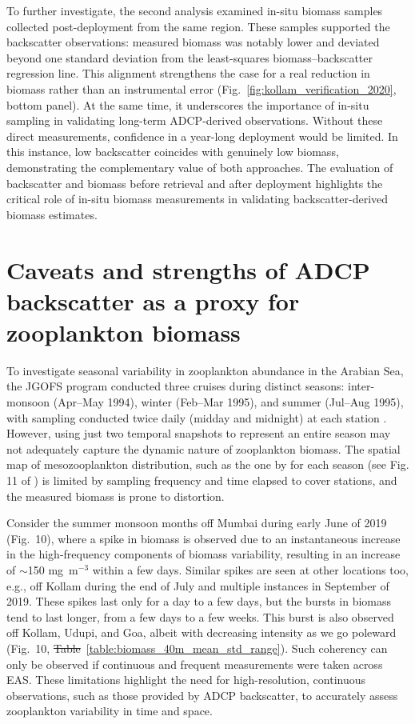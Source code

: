 \documentclass[12pt,a4paper]{article}
\providecommand{\DIFaddtex}[1]{{\protect\color{blue}\uwave{#1}}} %
\providecommand{\DIFdeltex}[1]{{\protect\color{red}\sout{#1}}}                      %
\providecommand{\DIFaddbegin}{} %
\providecommand{\DIFaddend}{} %
\providecommand{\DIFdelbegin}{} %
\providecommand{\DIFdelend}{} %
\providecommand{\DIFadd}[1]{\texorpdfstring{\DIFaddtex{#1}}{#1}} %
\providecommand{\DIFdel}[1]{\texorpdfstring{\DIFdeltex{#1}}{}} %
\newcommand{\DIFscaledelfig}{0.5}
\newlength{\DIFdelgraphicswidth} %
\newlength{\DIFdelgraphicsheight} %
\newcommand{\DIFaddincludegraphics}[2][]{{\color{blue}\fbox{\DIFOincludegraphics[#1]{#2}}}} %
\newcommand{\DIFdelincludegraphics}[2][]{%
\sbox{\DIFdelgraphicsbox}{\DIFOincludegraphics[#1]{#2}}%
\settoboxwidth{\DIFdelgraphicswidth}{\DIFdelgraphicsbox} %
\settoboxtotalheight{\DIFdelgraphicsheight}{\DIFdelgraphicsbox} %
\scalebox{\DIFscaledelfig}{%
\parbox[b]{\DIFdelgraphicswidth}{\usebox{\DIFdelgraphicsbox}\\[-\baselineskip] \rule{\DIFdelgraphicswidth}{0em}}\llap{\resizebox{\DIFdelgraphicswidth}{\DIFdelgraphicsheight}{%
\setlength{\unitlength}{\DIFdelgraphicswidth}%
\begin{picture}(1,1)%
\thicklines\linethickness{2pt} %
{\color[rgb]{1,0,0}\put(0,0){\framebox(1,1){}}}%
{\color[rgb]{1,0,0}\put(0,0){\line( 1,1){1}}}%
{\color[rgb]{1,0,0}\put(0,1){\line(1,-1){1}}}%
\end{picture}%
}\hspace*{3pt}}} %
} %
\DeclareRobustCommand{\DIFaddbegin}{\DIFOaddbegin \let\includegraphics\DIFaddincludegraphics} %
\DeclareRobustCommand{\DIFaddend}{\DIFOaddend \let\includegraphics\DIFOincludegraphics} %
\DeclareRobustCommand{\DIFdelbegin}{\DIFOdelbegin \let\includegraphics\DIFdelincludegraphics} %
\DeclareRobustCommand{\DIFdelend}{\DIFOaddend \let\includegraphics\DIFOincludegraphics} %
\begin{document}
To further investigate, the second analysis examined in-situ biomass samples collected post-deployment from the same region. These samples supported the backscatter observations: measured biomass was notably lower and deviated beyond one standard deviation from the least-squares biomass–backscatter regression line. This alignment strengthens the case for a real reduction in biomass rather than an instrumental error (Fig.~\ref{fig:kollam_verification_2020}, bottom panel). At the same time, it underscores the importance of in-situ sampling in validating long-term ADCP-derived observations. Without these direct measurements, confidence in a year-long deployment would be limited. In this instance, low backscatter coincides with genuinely low biomass, demonstrating the complementary value of both approaches. The evaluation of backscatter and biomass before retrieval and after deployment highlights the critical role of in-situ biomass measurements in validating backscatter-derived biomass estimates.


\section{Caveats and strengths of ADCP backscatter as a proxy for zooplankton biomass}
\label{sec:discuss.caveats.intraseasonal}

To investigate seasonal variability in zooplankton abundance in the Arabian Sea, the JGOFS program conducted three cruises during distinct seasons: inter-monsoon (Apr–May 1994), winter (Feb–Mar 1995), and summer (Jul–Aug 1995), with sampling conducted twice daily (midday and midnight) at each station \citep{madhupratap1996lack}. However, using just two temporal snapshots to represent an entire season may not adequately capture the dynamic nature of zooplankton biomass. The spatial map of mesozooplankton distribution, such as the one by \citet{jyothibabu2010re} for each season (see Fig. 11 of \cite{jyothibabu2010re}) is limited by sampling frequency and time elapsed to cover stations, and the measured biomass is prone to distortion.

Consider the summer monsoon months off Mumbai during early June of 2019 (Fig.~10), where a spike in biomass is observed due to an instantaneous increase in the high-frequency components of biomass variability, resulting in an increase of $\sim$150 mg~m$^{-3}$ within a few days. Similar spikes are seen at other locations too, e.g., off Kollam during the end of July and multiple instances in September of 2019. These spikes last only for a day to a few days, but the bursts in biomass tend to last longer, from a few days to a few weeks. This burst is also observed off Kollam, Udupi, and Goa, albeit with decreasing intensity as we go poleward (Fig.~10, \DIFdelbegin \DIFdel{Table}\DIFdelend \DIFaddbegin \DIFadd{table}\DIFaddend ~\ref{table:biomass_40m_mean_std_range}). Such coherency can only be observed if continuous and frequent measurements were taken across EAS. These limitations highlight the need for high-resolution, continuous observations, such as those provided by ADCP backscatter, to accurately assess zooplankton variability in time and space.
\end{document}
